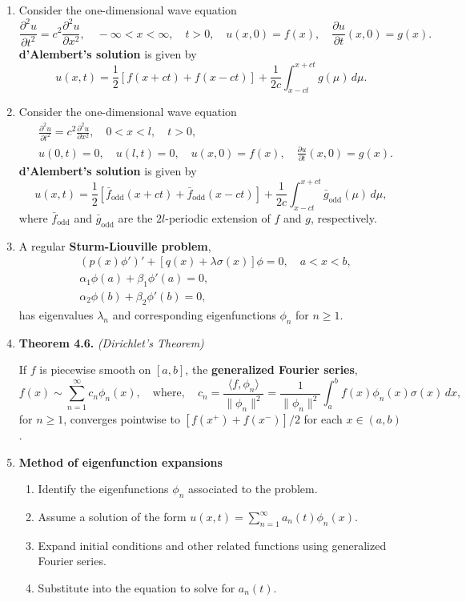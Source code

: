 \begin{enumerate}
\item Consider the one-dimensional wave equation
\[\frac{\partial^{2} u}{\partial t^{2}} = c^{2} \frac{\partial^{2} u}{\partial x^{2}}, \quad -\infty<x<\infty, \quad t>0, \quad u(x,0)=f(x), \quad \frac{\partial u}{\partial t}(x,0)=g(x).\]
\textbf{d'Alembert's solution} is given by
\[u(x,t)= \frac{1}{2}[f(x+ct)+f(x-ct)] + \frac{1}{2c} \int _{x-ct}^{x+ct} g(\mu)\, d\mu.\]

\item Consider the one-dimensional wave equation
\[
\begin{aligned}
& \frac{\partial^{2} u}{\partial t^{2}} = c^{2} \frac{\partial^{2} u}{\partial x^{2}}, \quad 0<x<l, \quad t>0, \\
& u(0,t)=0, \quad  u(l,t)=0, \quad u(x,0)=f(x), \quad \frac{\partial u}{\partial t}(x,0)=g(x).\end{aligned}
\]
\textbf{d'Alembert's solution} is given by
\[u(x,t)= \frac{1}{2}[\bar f_{\text{odd}}(x+ct)+ \bar f_{\text{odd}}(x-ct)] + \frac{1}{2c}\int _{x-ct}^{x+ct} \bar g_{\text{odd}}(\mu)\, d\mu,\]
where $\bar f_{\text{odd}}$ and $\bar g _{\text{odd}}$ are the $2l$-periodic extension of $f$ and $g$, respectively.



\item A regular \textbf{Sturm-Liouville problem},
\begin{align*}
& (p(x)\phi ' ) ' + [q(x) + \lambda \sigma(x)]\phi = 0, \quad a < x < b,\\
& \alpha _1 \phi(a) + \beta _1 \phi ' (a) = 0, \\
& \alpha _2 \phi(b) + \beta _2 \phi ' (b) = 0,
\end{align*}
has eigenvalues $\lambda_{n}$ and corresponding eigenfunctions $\phi_{n}$ for $n\geq 1$.

\item \textbf{Theorem 4.6.} \textit{(Dirichlet's Theorem)}

If $f$ is piecewise smooth on $[a, b]$, the \textbf{generalized Fourier series},
\[
f(x)\sim \sum_{n=1}^{\infty} c_{n}\phi_{n}(x), \quad 
\text{where}, \quad
c_{n}=\frac{\langle f, \phi_{n}\rangle}{\|\phi_{n}\|^{2}} = \frac{1}{\|\phi_{n}\|^{2}}\int_{a}^{b} f(x)\phi_{n}(x)\sigma(x)\,dx,
\]
for $n \geq 1$, converges pointwise to $[f (x ^{+} ) + f (x ^{-} )]/2$ for each $x \in (a, b)$.



\item \textbf{Method of eigenfunction expansions} 
\begin{enumerate}[1)]
    \item Identify the eigenfunctions $\phi_{n}$ associated to the problem.
    \item Assume a solution of the form $u(x,t) = \sum_{n=1}^{\infty} a_{n}(t)\phi_{n}(x)$. 
    \item Expand initial conditions and other related functions using generalized Fourier series.
    \item Substitute into the equation to solve for $a_{n}(t)$.
\end{enumerate}



\end{enumerate}
